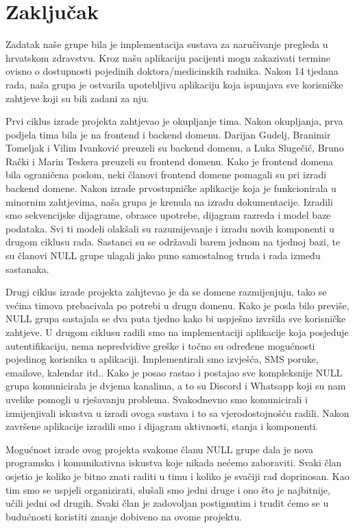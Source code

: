 \chapter{Zaključak}
		
		 \texttt{}{Zadatak naše grupe bila je implementacija sustava za naručivanje pregleda u hrvatskom zdravstvu. Kroz našu aplikaciju pacijenti mogu zakazivati termine ovisno o dostupnosti pojedinih doktora/medicinskih radnika. Nakon 14 tjedana rada, naša grupa je ostvarila upotebljivu aplikaciju koja ispunjava sve korisničke zahtjeve koji su bili zadani za nju. }
   
   
          \texttt{}{
          Prvi ciklus izrade projekta zahtjevao je okupljanje tima. Nakon okupljanja, prva podjela tima bila je na frontend i backend domenu. Darijan Gudelj, Branimir Tomeljak i Vilim Ivanković preuzeli su backend domenu, a Luka Slugečić, Bruno Rački i Marin Teskera preuzeli su frontend domenu. Kako je frontend domena bila ograničena poslom, neki članovi frontend domene pomagali su pri izradi backend domene. Nakon izrade prvostupničke aplikacije koja je funkcionirala u minornim zahtjevima, naša grupa je krenula na izradu dokumentacije. Izradili smo sekvencijske dijagrame, obrasce upotrebe, dijagram razreda i model baze podataka. Svi ti modeli olakšali su razumijevanje i izradu novih komponenti u drugom ciklusu rada. Sastanci su se održavali barem jednom na tjednoj bazi, te su članovi NULL grupe ulagali jako puno samostalnog truda i rada između sastanaka.
          }

          \texttt{}{
          Drugi ciklus izrade projekta zahjtevao je da se domene razmijenjuju, tako se većina timova prebacivala po potrebi u drugu domenu. Kako je posla bilo previše, NULL grupa sastajala se dva puta tjedno kako bi uspješno izvršila sve korisničke zahtjeve. U drugom ciklusu radili smo na implementaciji aplikacije koja posjeduje autentifikaciju, nema nepredvidive greške i točno su određene mogućnosti pojedinog korisnika u aplikaciji. Implementirali smo izvješća, SMS poruke, emailove, kalendar itd.. Kako je posao rastao i postajao sve kompleksnije NULL grupa komunicirala je dvjema kanalima, a to su Discord i Whatsapp koji su nam uvelike pomogli u rješavanju problema. Svakodnevno smo komunicirali i izmijenjivali iskustva u izradi ovoga sustava i to sa vjerodostojnošću radili. Nakon završene aplikacije izradili smo i dijagram aktivnosti, stanja i komponenti. 

          Mogućnost izrade ovog projekta svakome članu NULL grupe dala je nova programska i komunikativna iskustva koje nikada nećemo zaboraviti. Svaki član osjetio je koliko je bitno znati raditi u timu i koliko je svačiji rad doprinosan. Kao tim smo se uspjeli organizirati, slušali smo jedni druge i ono što je najbitnije, učili jedni od drugih. 
          Svaki član je zadovoljan postignutim i trudit ćemo se u budućnosti koristiti znanje dobiveno na ovome projektu.
          }
		
		\eject 